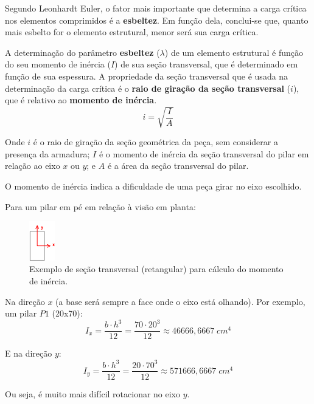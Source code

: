 Segundo Leonhardt Euler, o fator mais importante que determina a carga crítica nos elementos comprimidos é a \textbf{esbeltez}. Em função dela, conclui-se que, quanto mais esbelto for o elemento estrutural, menor será sua carga crítica.

A determinação do parâmetro \textbf{esbeltez} ($\lambda$) de um elemento estrutural é função do seu momento de inércia ($I$) de sua seção transversal, que é determinado em função de sua espessura. A propriedade da seção transversal que é usada na determinação da carga crítica é o \textbf{raio de giração da seção transversal} ($i$), que é relativo ao \textbf{momento de inércia}.
\begin{equation}i=\sqrt{\frac{I}{A}}\end{equation}

Onde $i$ é o raio de giração da seção geométrica da peça, sem considerar a presença da armadura; $I$ é o momento de inércia da seção transversal do pilar em relação ao eixo $x$ ou $y$; e $A$ é a área da seção transversal do pilar.

O momento de inércia indica a dificuldade de uma peça girar no eixo escolhido.

Para um pilar em pé em relação à visão em planta:

\begin{figure}[H]
	\begin{center}
	\caption{Exemplo de seção transversal (retangular) para cálculo do momento de inércia.}
    	\includegraphics[width=0.1\textwidth]{Indice-de-esbeltez/Imagens/Secao-transversal-pilar.png}
	\end{center}
\end{figure}

Na direção $x$ (a base será sempre a face onde o eixo está olhando). Por exemplo, um pilar $P1$ (20x70):
$$I_x=\frac{b\cdot h^3}{12}=\frac{70\cdot{20}^3}{12}\approx46666,6667\;{cm}^4$$

E na direção $y$:
$$I_y=\frac{b\cdot h^3}{12}=\frac{20\cdot{70}^3}{12}\approx571666,6667\;{cm}^4$$

Ou seja, é muito mais difícil rotacionar no eixo $y$.
